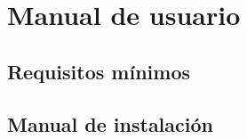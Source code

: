 \section{Manual de usuario} \label{sec:man}
    \subsection{Requisitos mínimos}
        
        

    \subsection{Manual de instalación}
        